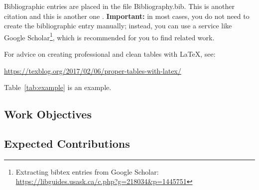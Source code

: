  
Bibliographic entries are placed in the file \textsf{Bibliography.bib}.
This is another citation \cite{McDonagh:2011dp} and this is another one \cite{Feller:2011ys}.
\textbf{Important:} in most cases, you do not need to create the bibliographic entry manually; instead, you can use a service like Google Scholar\footnote{Extracting bibtex entries from Google Scholar: \url{https://libguides.usask.ca/c.php?g=218034&p=1445751}}, which is recommended for you to find related work.

For advice on creating professional and clean tables with \LaTeX, see:

\url{https://texblog.org/2017/02/06/proper-tables-with-latex/}

Table~\ref{tab:example} is an example.

\subsection{Work Objectives}
\lipsum[2] %

\subsection{Expected Contributions}
\lipsum[2] %
